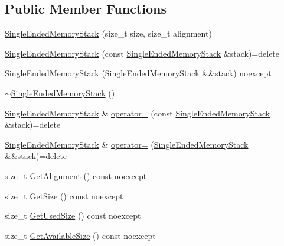 \subsection*{Public Member Functions}
\begin{DoxyCompactItemize}
\item 
\mbox{\hyperlink{classmage_1_1_single_ended_memory_stack_ab9555d63b35070aee321cc3839fec3c4}{Single\+Ended\+Memory\+Stack}} (size\+\_\+t size, size\+\_\+t alignment)
\item 
\mbox{\hyperlink{classmage_1_1_single_ended_memory_stack_ae854c4558f0215bf38cb713cbca7fa31}{Single\+Ended\+Memory\+Stack}} (const \mbox{\hyperlink{classmage_1_1_single_ended_memory_stack}{Single\+Ended\+Memory\+Stack}} \&stack)=delete
\item 
\mbox{\hyperlink{classmage_1_1_single_ended_memory_stack_afd6632eac3ada6ea88a69b586f27a4e4}{Single\+Ended\+Memory\+Stack}} (\mbox{\hyperlink{classmage_1_1_single_ended_memory_stack}{Single\+Ended\+Memory\+Stack}} \&\&stack) noexcept
\item 
\mbox{\hyperlink{classmage_1_1_single_ended_memory_stack_adaa82d19a1ef60ca42396bdaaea0c8e6}{$\sim$\+Single\+Ended\+Memory\+Stack}} ()
\item 
\mbox{\hyperlink{classmage_1_1_single_ended_memory_stack}{Single\+Ended\+Memory\+Stack}} \& \mbox{\hyperlink{classmage_1_1_single_ended_memory_stack_a709db7d21cd2db6e98acd7985770468e}{operator=}} (const \mbox{\hyperlink{classmage_1_1_single_ended_memory_stack}{Single\+Ended\+Memory\+Stack}} \&stack)=delete
\item 
\mbox{\hyperlink{classmage_1_1_single_ended_memory_stack}{Single\+Ended\+Memory\+Stack}} \& \mbox{\hyperlink{classmage_1_1_single_ended_memory_stack_a24613dc91ab6577aa57fbd55a4c81023}{operator=}} (\mbox{\hyperlink{classmage_1_1_single_ended_memory_stack}{Single\+Ended\+Memory\+Stack}} \&\&stack)=delete
\item 
size\+\_\+t \mbox{\hyperlink{classmage_1_1_single_ended_memory_stack_a821660699258ecbd007c5909108a911b}{Get\+Alignment}} () const noexcept
\item 
size\+\_\+t \mbox{\hyperlink{classmage_1_1_single_ended_memory_stack_aa1df0adf194d6c2bb6c7597a96c10e61}{Get\+Size}} () const noexcept
\item 
size\+\_\+t \mbox{\hyperlink{classmage_1_1_single_ended_memory_stack_ab2b07a4cf2c9eb9988ad49174e0804ac}{Get\+Used\+Size}} () const noexcept
\item 
size\+\_\+t \mbox{\hyperlink{classmage_1_1_single_ended_memory_stack_a1c3f233b16e8fcb9770b7fe23b83485b}{Get\+Available\+Size}} () const noexcept

\end{DoxyCompactItemize}
